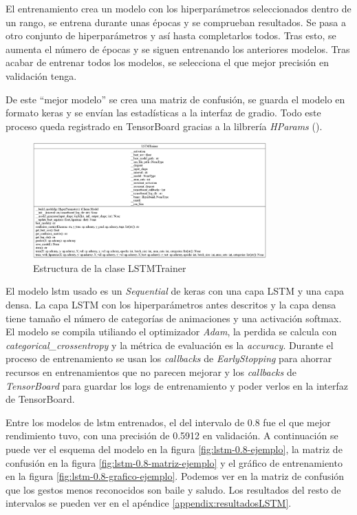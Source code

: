El entrenamiento crea un modelo con los hiperparámetros seleccionados dentro de un rango, se entrena durante unas épocas y se comprueban resultados. Se pasa a otro conjunto de hiperparámetros y así hasta completarlos todos. Tras esto, se aumenta el número de épocas y se siguen entrenando los anteriores modelos. Tras acabar de entrenar todos los modelos, se selecciona el que mejor precisión en validación tenga.

De este ``mejor modelo'' se crea una matriz de confusión, se guarda el modelo en formato keras y se envían las estadísticas a la interfaz de gradio. Todo este proceso queda registrado en TensorBoard gracias a la lilbrería \textit{HParams} (\cite{hparams}).

\begin{figure}[h!]
    \centering
    \includegraphics[width=0.8\textwidth]{Imagenes/Bitmap/classes_LSTMTrainer.png}
    \caption{Estructura de la clase LSTMTrainer}
    \label{fig:lstm-estructura}
\end{figure}

El modelo \gls{lstm} usado es un \textit{Sequential} de keras con una capa LSTM y una capa densa. La capa LSTM con los hiperparámetros antes descritos y la capa densa tiene tamaño el número de categorías de animaciones y una activación softmax. El modelo se compila utiliando el optimizador \textit{Adam}, la perdida se calcula con \textit{categorical\_crossentropy} y la métrica de evaluación es la \textit{accuracy}. Durante el proceso de entrenamiento se usan los \textit{callbacks} de \textit{EarlyStopping} para ahorrar recursos en entrenamientos que no parecen mejorar y los \textit{callbacks} de \textit{TensorBoard} para guardar los logs de entrenamiento y poder verlos en la interfaz de TensorBoard.

Entre los modelos de \gls{lstm} entrenados, el del intervalo de 0.8 fue el que mejor rendimiento tuvo, con una precisión de 0.5912 en validación. A continuación se puede ver el esquema del modelo en la figura \ref{fig:lstm-0.8-ejemplo}, la matriz de confusión en la figura \ref{fig:lstm-0.8-matriz-ejemplo} y el gráfico de entrenamiento en la figura \ref{fig:lstm-0.8-grafico-ejemplo}. Podemos ver en la matriz de confusión que los gestos menos reconocidos son baile y saludo. Los resultados del resto de intervalos se pueden ver en el apéndice \ref{appendix:resultadosLSTM}.

